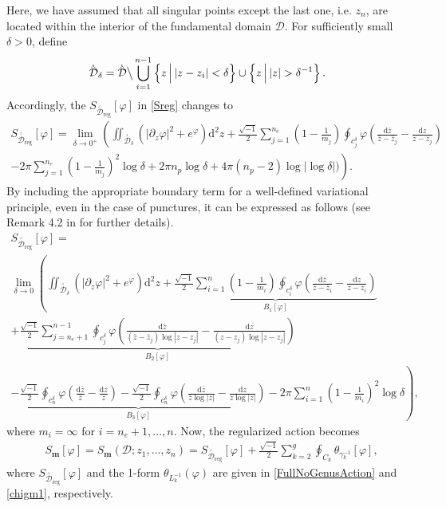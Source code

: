\documentclass[a4paper,11pt]{article}
\newcommand{\dd}{\mathrm{d}}
\newcommand{\SchottkyFund}{\mathcal{D}}
\newcommand{\singfund}{\overset{{}_{\curlywedge}}{\mathcal{D}}}
\begin{document}
Here, we have assumed that all singular points except the last one, i.e. $z_n$, are located within the interior of the fundamental domain  $\SchottkyFund$. For sufficiently small $\delta >0$, define
\begin{equation}
\singfund_{\delta} = \singfund \big\backslash  \bigcup_{i=1}^{n-1}\left\{z \, \Big| \, |z-z_i|<\delta\right\} \cup \left\{z \, \Big| \, |z|>\delta^{-1}\right\}.
\end{equation}
Accordingly, the $S_{\singfund_{\text{reg}}}[\varphi]$ in \eqref{Sreg} changes to
\begin{multline}\label{Sb}
S_{\singfund_{\text{reg}}}[\varphi] = 
\lim_{\delta \to 0^{+}} \left(\iint_{\singfund_{\delta}}(|\partial_z \varphi|^2 + e^{\varphi}) \dd^2{z}  + \frac{\sqrt{-1}}{2} \sum_{j=1}^{n_e} \left(1-\frac{1}{m_j}\right) \oint_{c_{j}^{\delta}} \varphi \left(\frac{\dd{\bar{z}}}{\bar{z}-\bar{z}_{j}} - \frac{\dd{z}}{z - z_{j}}\right)\right. \\ 
\left. - 2\pi \sum_{j=1}^{n_e} \left(1-\frac{1}{m_j}\right)^2 \log\delta    + 2 \pi n_p \log\delta + 4 \pi (n_p-2) \log|\log\delta|\big) \right).
\end{multline}
By including the appropriate boundary term for a well-defined variational principle, even in the case of punctures, it can be expressed as follows (see Remark 4.2 in \cite{Taghavi2024classical} for further details).
\begin{multline}\label{FullNoGenusAction}
S_{\singfund_{\text{reg}}}[\varphi] = \\
\lim_{\delta \to 0} \left(\iint_{\singfund_{\delta}}(|\partial_z \varphi|^2 + e^{\varphi}) \dd^2{z}  + \underbrace{\frac{\sqrt{-1}}{2} \sum_{i=1}^{n} \left(1-\frac{1}{m_i}\right) \oint_{c_{i}^{\delta}} \varphi \left(\frac{\dd{\bar{z}}}{\bar{z}-\bar{z}_{i}} - \frac{\dd{z}}{z - z_{i}}\right)}_{B_1[\varphi]}\right. \\ 
+\underbrace{\frac{\sqrt{-1}}{2} \sum_{j=n_e+1}^{n-1}  \oint_{c_{j}^{\delta}} \varphi \left(\frac{\dd{\bar{z}}}{(\bar{z}-\bar{z}_{j})\log|z-z_j|} - \frac{\dd{z}}{(z-z_j)\log|z-z_j|} \right)}_{B_2[\varphi]}  \\
\left.\underbrace{-\frac{\sqrt{-1}}{2} \oint_{c_{n}^{\delta}} \varphi \left(\frac{\dd{\bar{z}}}{\bar{z}} - \frac{\dd{z}}{z}\right) -\frac{\sqrt{-1}}{2} \oint_{c_{n}^{\delta}} \varphi \left(\frac{\dd{\bar{z}}}{\bar{z}\log|z|} - \frac{\dd{z}}{z\log|z|}\right)}_{B_3[\varphi]} -2\pi \sum_{i=1}^{n} \left(1-\frac{1}{m_i}\right)^2 \log\delta 
\right),
\end{multline}
where $m_i = \infty$ for $i=n_e+1,\dots,n$. Now, the regularized action becomes 
\begin{equation}
\begin{split}
&S_{\boldsymbol{m}}[\varphi] = S_{\boldsymbol{m}}(\SchottkyFund;z_1,\dots,z_{n}) 
= S_{\singfund_{\text{reg}}}[\varphi] + \frac{\sqrt{-1}}{2} \sum_{k=2}^{g} \oint_{C_k} \theta_{\gamma_k^{-1}}[\varphi],
\end{split}\label{regularizeLiouvilleaction2}
\end{equation}
where $S_{\singfund_{\text{reg}}}[\varphi]$ and the 1-form $\theta_{L_k^{-1}}(\varphi)$ are given in \eqref{FullNoGenusAction} and \eqref{chigm1}, respectively. 
\end{document}
